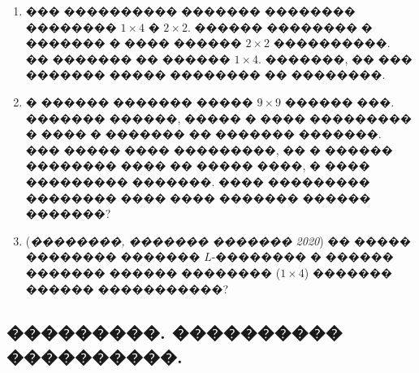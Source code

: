 \documentclass[a4paper,12pt]{article}
\begin{document}
\begin{enumerate}
\item ��� ���������� ������� �������� �������� $1\times 4$ � $2\times 2$. ������ �������� � ������� � ���� ������ $2\times 2$ ����������. �� ������� �� ������ $1\times 4$. �������, �� ��� ������� ����� �������� �� ��������.

\item � ������ ������� ����� $9\times 9$ ������ ���. ������� ������, ����� � ���� ��������� � ���� � ������� �� ������� �������. ��� ����� ���� ���������, �� � ������ �������� ���� �� ����� ����, � ���� ��������� �������. ���� ��������� �������� ���� ���� ������� ������ �������?

\item (\textit{��������, ������� ������� 2020}) �� ����� �������� ������� $L$-�������� � ������ ������� ������ �������� ($1\times 4$) ������� ������ �����������?
\end{enumerate}







\newpage

\begin{center}
\section*{���������. ���������� ����������.}
\end{center}

\medskip\medskip\medskip
\end{document}
